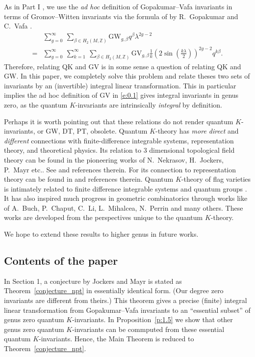 \documentclass[11pt]{amsart}
\newtheorem*{main theorem*}{Main Theorem}
\theoremstyle{remark}
\numberwithin{equation}{section}
\newcommand{\GW}{{\mathrm{GW}}}
\newcommand{\GV}{{\mathrm{GV}}}
\begin{document}
As in Part I \cite{Chou_Lee_2022_QKGVI}, we use the \textit{ad hoc} definition of Gopakumar--Vafa invariants in terms of Gromov--Witten invariants via the formula of by R.~Gopakumar and C.~Vafa \cite{Gopakumar_Vafa_1998}.
\begin{equation} \label{e:0.1}
\begin{split}
&\sum _{g=0}^{\infty }~\sum _{\beta \in H_{2}(M,\mathbb {Z} )}{\GW}_{g,\beta} q^{\beta }\lambda ^{2g-2} \\
= & \sum _{g=0}^{\infty }~\sum _{k=1}^{\infty }~\sum _{\beta \in H_{2}(M,\mathbb {Z} )}{\GV}_{g,\beta}{\frac {1}{k}}\left(2\sin \left({\frac {k\lambda }{2}}\right)\right)^{2g-2}q^{k\beta } .
\end{split}
\end{equation}
Therefore, relating QK and GV is in some sense a question of relating QK and GW.
In this paper, we completely solve this problem and relate theses two sets of invariants by an (invertible) integral linear transformation. This in particular implies the ad hoc definition of GV in \eqref{e:0.1} gives integral invariants in genus zero, as the quantum $K$-invariants are intrinsically \emph{integral} by definition.

Perhaps it is worth pointing out that these relations do not render quantum $K$-invariants, or GW, DT, PT, obsolete. Quantum $K$-theory has \emph{more direct} and \emph{different}
connections with finite-difference integrable systems, representation theory, and theoretical physics. Its relation to $3$ dimensional topological field theory can be found in the pioneering works of N.~Nekrasov, H.~Jockers, P.~Mayr etc.. See \cite{Jockers_Mayr_2019, Jockers_Mayr_2020} and references therein. For its connection to representation theory can be found in \cite{Okounkov_lectures} and references therein. Quantum $K$-theory of flag varieties is intimately related to finite difference integrable systems and quantum groups \cite{Givental_Lee_2003}. It has also inspired much progress in geometric combinatorics through works like \cite{Buch_2011, Buch_2013, Buch_2020} of A.~Buch, P.~Chaput, C.~Li, L.~Mihalcea, N.~Perrin and many others. These works are developed from the perspectives unique to the quantum $K$-theory.

We hope to extend these results to higher genus in future works.





\subsection{Contents of the paper}
In Section 1, a conjecture by Jockers and Mayr \cite{Jockers_Mayr_2019} is stated as Theorem~\ref{conjecture_npt} in essentially identical form. (Our degree zero invariants are different from theirs.) This theorem gives a precise (finite) integral linear transformation from Gopakumar--Vafa invariants to an ``essential subset'' of genus zero quantum $K$-invariants. In Proposition~\ref{p:1.5} we show that other genus zero quantum $K$-invariants can be commputed from these essential quantum $K$-invariants. Hence, the Main Theorem is reduced to Theorem~\ref{conjecture_npt}.
\end{document}
